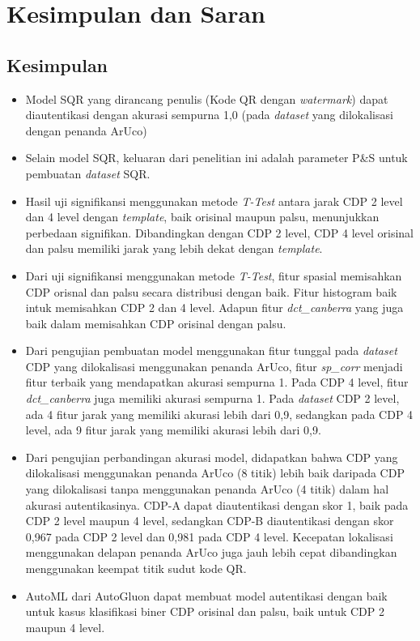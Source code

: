 \chapter{Kesimpulan dan Saran}

\section{Kesimpulan}
\begin{itemize}
    \item Model SQR yang dirancang penulis (Kode QR dengan \emph{watermark}) dapat diautentikasi dengan akurasi sempurna 1,0 (pada \emph{dataset} yang dilokalisasi
          dengan penanda ArUco)
    \item Selain model SQR, keluaran dari penelitian ini adalah parameter P\&S untuk pembuatan \emph{dataset} SQR.
    \item Hasil uji signifikansi menggunakan metode \emph{T-Test} antara jarak CDP 2 level dan 4 level dengan \emph{template}, baik orisinal maupun palsu, menunjukkan
          perbedaan signifikan. Dibandingkan dengan CDP 2 level, CDP 4 level orisinal dan palsu memiliki jarak yang lebih dekat dengan \emph{template}.
    \item Dari uji signifikansi menggunakan metode \emph{T-Test}, fitur spasial memisahkan CDP orisnal dan palsu secara distribusi dengan baik. Fitur histogram baik
          intuk memisahkan CDP 2 dan 4 level. Adapun fitur \emph{dct\_canberra} yang juga baik dalam memisahkan CDP orisinal dengan palsu.
    \item Dari pengujian pembuatan model menggunakan fitur tunggal pada \emph{dataset} CDP yang dilokalisasi menggunakan penanda ArUco, fitur \emph{sp\_corr} menjadi
          fitur terbaik yang mendapatkan akurasi sempurna 1. Pada CDP 4 level, fitur \emph{dct\_canberra} juga memiliki akurasi sempurna 1. Pada \emph{dataset} CDP 2
          level, ada 4 fitur jarak yang memiliki akurasi lebih dari 0,9, sedangkan pada CDP 4 level, ada 9 fitur jarak yang memiliki akurasi lebih dari 0,9.
    \item Dari pengujian perbandingan akurasi model, didapatkan bahwa CDP yang dilokalisasi menggunakan penanda ArUco (8 titik) lebih baik daripada CDP yang dilokalisasi
          tanpa menggunakan penanda ArUco (4 titik) dalam hal akurasi autentikasinya. CDP-A dapat diautentikasi dengan skor 1, baik pada CDP 2 level maupun 4 level,
          sedangkan CDP-B diautentikasi dengan skor 0,967 pada CDP 2 level dan 0,981 pada CDP 4 level. Kecepatan lokalisasi menggunakan delapan penanda ArUco juga jauh
          lebih cepat dibandingkan menggunakan keempat titik sudut kode QR.
    \item AutoML dari AutoGluon dapat membuat model autentikasi dengan baik untuk kasus klasifikasi biner CDP orisinal dan palsu, baik untuk CDP 2 maupun 4 level.
\end{itemize}

